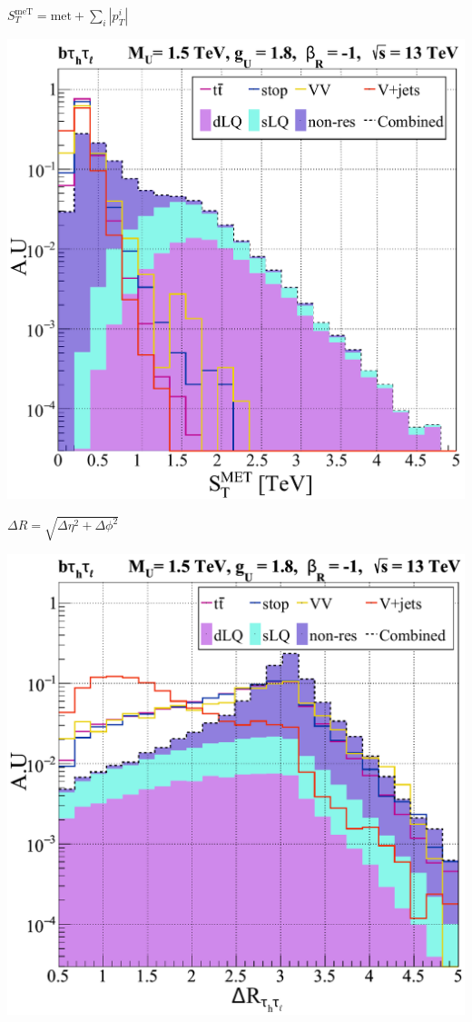 \documentclass{../bredelebeamer}
\begin{document}
\begin{frame}{$S_T^{\text{meT}}=\text{met} + \sum_i\left|p_{T}^i\right|$}
	\begin{center}
		\includegraphics[width=.65\linewidth]{sTTeV_semileptonic_sLQ_wRHC.pdf}
	\end{center}
	
\end{frame}

\begin{frame}{$\Delta R = \sqrt{\Delta \eta^2 + \Delta \phi^2}$}
	\begin{center}
		\includegraphics[width=.65\linewidth]{DeltaR_semileptonic_sLQ_wRHC.pdf}	
	\end{center}
	
\end{frame}
\end{document}
